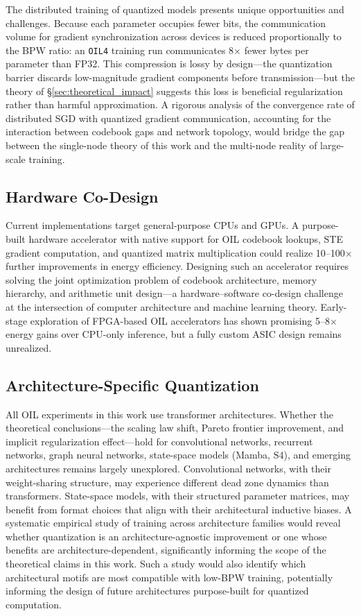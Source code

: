 The distributed training of quantized models presents unique opportunities and challenges. Because each parameter occupies fewer bits, the communication volume for gradient synchronization across devices is reduced proportionally to the BPW ratio: an \texttt{OIL4} training run communicates 8$\times$ fewer bytes per parameter than FP32. This compression is lossy by design---the quantization barrier discards low-magnitude gradient components before transmission---but the theory of \S\ref{sec:theoretical_impact} suggests this loss is beneficial regularization rather than harmful approximation. A rigorous analysis of the convergence rate of distributed SGD with quantized gradient communication, accounting for the interaction between codebook gaps and network topology, would bridge the gap between the single-node theory of this work and the multi-node reality of large-scale training.

\subsection{Hardware Co-Design}

Current \OIL{} implementations target general-purpose CPUs and GPUs. A purpose-built hardware accelerator with native support for OIL codebook lookups, STE gradient computation, and quantized matrix multiplication could realize 10--100$\times$ further improvements in energy efficiency. Designing such an accelerator requires solving the joint optimization problem of codebook architecture, memory hierarchy, and arithmetic unit design---a hardware--software co-design challenge at the intersection of computer architecture and machine learning theory. Early-stage exploration of FPGA-based OIL accelerators has shown promising 5--8$\times$ energy gains over CPU-only inference, but a fully custom ASIC design remains unrealized.

\subsection{Architecture-Specific Quantization}

All OIL experiments in this work use transformer architectures. Whether the theoretical conclusions---the scaling law shift, Pareto frontier improvement, and implicit regularization effect---hold for convolutional networks, recurrent networks, graph neural networks, state-space models (Mamba, S4), and emerging architectures remains largely unexplored. Convolutional networks, with their weight-sharing structure, may experience different dead zone dynamics than transformers. State-space models, with their structured parameter matrices, may benefit from format choices that align with their architectural inductive biases. A systematic empirical study of \OIL{} training across architecture families would reveal whether quantization is an architecture-agnostic improvement or one whose benefits are architecture-dependent, significantly informing the scope of the theoretical claims in this work. Such a study would also identify which architectural motifs are most compatible with low-BPW training, potentially informing the design of future architectures purpose-built for quantized computation.

